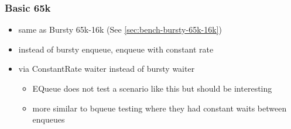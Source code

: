 \subsubsection{Basic 65k}
\begin{itemize}
    \item same as Bursty 65k-16k (See \autoref{sec:bench-bursty-65k-16k})
    \item instead of bursty enqueue, enqueue with constant rate
    \item via ConstantRate waiter instead of bursty waiter
        \begin{itemize}
            \item EQueue does not test a scenario like this but should be interesting
            \item more similar to bqueue testing where they had constant waits between enqueues
        \end{itemize}
\end{itemize}

